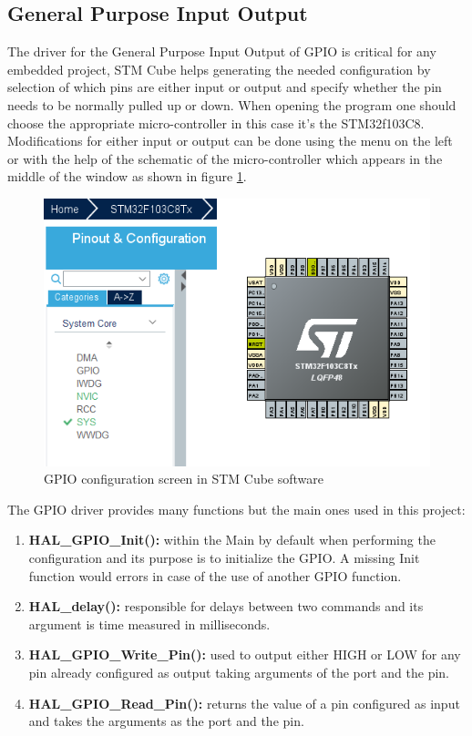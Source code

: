 \subsection{General Purpose Input Output}
The driver for the General Purpose Input Output of GPIO is critical for any embedded project, STM Cube helps generating the needed configuration by selection of which pins are either input or output and specify whether the pin needs to be normally pulled up or down. When opening the program one should choose the appropriate micro-controller in this case it’s the STM32f103C8.\\
Modifications for either input or output can be done using the menu on the left or with the help of the schematic of the micro-controller which appears in the middle of the window as shown in figure \ref{fig:gpio-config}.\\
\clearpage
\begin{figure}[h]
   \centering
    \includegraphics[width=\textwidth]{figure/4_1.png}
    \caption{GPIO configuration screen in STM Cube software}
    \label{fig:gpio-config}
\end{figure}

The GPIO driver provides many functions but the main ones used in this project:
\begin{enumerate}
    \item \textbf{HAL\_GPIO\_Init():} within the Main by default when performing the configuration and its purpose is to initialize the GPIO. A missing Init function would errors in case of the use of another GPIO function.
    \item \textbf{HAL\_delay():} responsible for delays between two commands and its argument is time measured in milliseconds.
    \item \textbf{HAL\_GPIO\_Write\_Pin():} used to output either HIGH or LOW for any pin already configured as output taking arguments of the port and the pin.
    \item \textbf{HAL\_GPIO\_Read\_Pin():} returns the value of a pin configured as input and takes the arguments as the port and the pin.
\end{enumerate}

